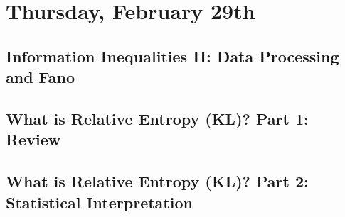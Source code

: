 \documentclass[11pt]{article}
\begin{document}
    \section{Thursday, February 29th}
    \subsection{Information Inequalities II: Data Processing and Fano}
    \begin{minipage}{\textwidth}
    
    \end{minipage}
    

    \subsection{What is Relative Entropy (KL)? Part 1: Review}
    \begin{minipage}{\textwidth}
    
    \end{minipage}
    

    \subsection{What is Relative Entropy (KL)? Part 2: Statistical Interpretation}
    \begin{minipage}{\textwidth}
    
    \end{minipage}
    

    
    
    
    
    
    
    
    
    
    
    
    
    
    
    
    
\end{document}
